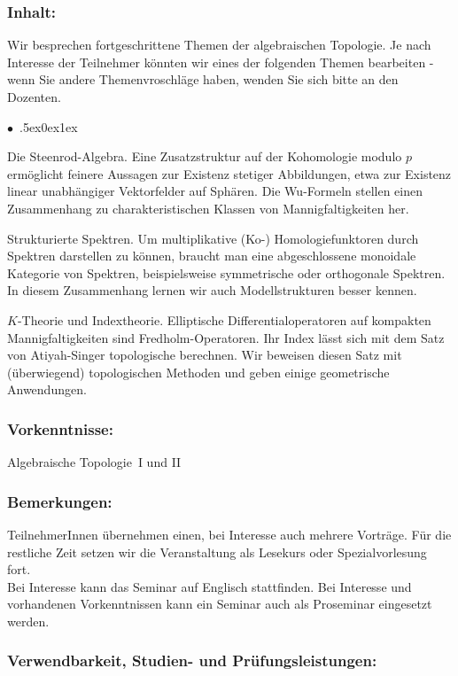 \documentclass[a4paper,10pt]{article}
\renewenvironment{itemize}{\begin{list}{$\bullet$\ }{\itemsep.5ex\setlength{\topsep}{0.5\itemsep}\parsep0ex\labelsep1ex\settowidth{\labelwidth}{$\bullet$\ }\setlength{\leftmargin}{\labelwidth}\addtolength{\leftmargin}{3ex}\addtolength{\leftmargin}{\labelsep}}}{\end{list}}
\begin{document}
\subsubsection*{\large
    Inhalt:
}
Wir besprechen fortgeschrittene Themen der algebraischen Topologie.
Je nach Interesse der Teilnehmer könnten wir eines der folgenden Themen bearbeiten - wenn Sie andere Themenvroschläge haben, wenden Sie sich bitte an den Dozenten.
\begin{itemize}
\item Die Steenrod-Algebra. Eine Zusatzstruktur auf der Kohomologie modulo $p$
ermöglicht feinere Aussagen zur Existenz stetiger Abbildungen, etwa zur Existenz linear unabhängiger Vektorfelder auf Sphären. Die Wu-Formeln stellen einen Zusammenhang zu charakteristischen Klassen von Mannigfaltigkeiten her.
\item  Strukturierte Spektren. Um multiplikative (Ko-) Homologiefunktoren
durch Spektren darstellen zu können, braucht man eine abgeschlossene monoidale Kategorie von Spektren, beispielsweise
symmetrische oder orthogonale Spektren. In diesem Zusammenhang
lernen wir auch Modellstrukturen besser kennen.
\item $K$-Theorie und Indextheorie. Elliptische Differentialoperatoren auf kompakten Mannigfaltigkeiten sind Fredholm-Operatoren. Ihr Index lässt sich mit dem Satz von Atiyah-Singer topologische berechnen. Wir beweisen diesen Satz mit (überwiegend) topologischen Methoden und geben einige geometrische Anwendungen.
\end{itemize} 
\subsubsection*{\large
    Vorkenntnisse:
}
Algebraische Topologie~I und II
\subsubsection*{\large
    Bemerkungen:
}
TeilnehmerInnen übernehmen einen, bei Interesse auch mehrere Vorträge.
Für die restliche Zeit setzen wir die Veranstaltung als Lesekurs oder Spezialvorlesung fort. \\
Bei Interesse kann das Seminar auf Englisch stattfinden.
Bei Interesse und vorhandenen Vorkenntnissen kann ein Seminar auch als Proseminar eingesetzt werden.
\cleardoublepage
\subsubsection*{\large
    Verwendbarkeit, Studien- und Prüfungsleistungen:
}
\end{document}
